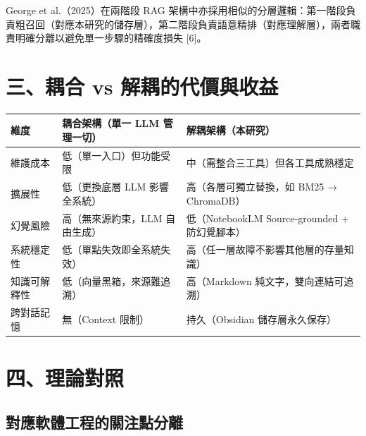 George et al.（2025）在兩階段 RAG
架構中亦採用相似的分層邏輯：第一階段負責粗召回（對應本研究的儲存層），第二階段負責語意精排（對應理解層），兩者職責明確分離以避免單一步驟的精確度損失
{[}6{]}。

\section{三、耦合 vs
解耦的代價與收益}\label{ux4e09ux8026ux5408-vs-ux89e3ux8026ux7684ux4ee3ux50f9ux8207ux6536ux76ca}

{\def\LTcaptype{none} %
\begin{longtable}[]{@{}
  >{\raggedright\arraybackslash}p{}
  >{\raggedright\arraybackslash}p{}
  >{\raggedright\arraybackslash}p{}@{}}
\toprule\noalign{}
\begin{minipage}[b]{\linewidth}\raggedright
維度
\end{minipage} & \begin{minipage}[b]{\linewidth}\raggedright
耦合架構（單一 LLM 管理一切）
\end{minipage} & \begin{minipage}[b]{\linewidth}\raggedright
解耦架構（本研究）
\end{minipage} \\
\midrule\noalign{}
\endhead
\bottomrule\noalign{}
\endlastfoot
維護成本 & 低（單一入口）但功能受限 &
中（需整合三工具）但各工具成熟穩定 \\
擴展性 & 低（更換底層 LLM 影響全系統） & 高（各層可獨立替換，如 BM25 →
ChromaDB） \\
幻覺風險 & 高（無來源約束，LLM 自由生成） & 低（NotebookLM
Source-grounded + 防幻覺腳本） \\
系統穩定性 & 低（單點失效即全系統失效） &
高（任一層故障不影響其他層的存量知識） \\
知識可解釋性 & 低（向量黑箱，來源難追溯） & 高（Markdown
純文字，雙向連結可追溯） \\
跨對話記憶 & 無（Context 限制） & 持久（Obsidian 儲存層永久保存） \\
\end{longtable}
}

\section{四、理論對照}\label{ux56dbux7406ux8ad6ux5c0dux7167}

\subsection{對應軟體工程的關注點分離}\label{ux5c0dux61c9ux8edfux9ad4ux5de5ux7a0bux7684ux95dcux6ce8ux9edeux5206ux96e2}


